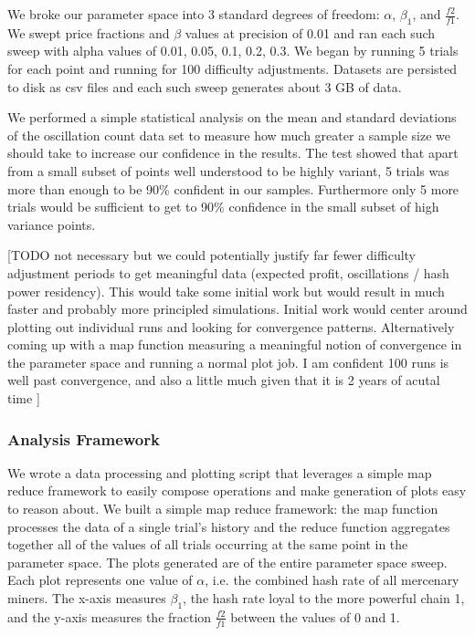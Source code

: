 \documentclass[10pt, preprint]{aastex}
\begin{document}
We broke our parameter space into 3 standard degrees of freedom: $\alpha$, $\beta_1$, and $\frac{f2}{f1}$.  We swept price fractions and $\beta$ values at precision of 0.01 and ran each such sweep with alpha values of 0.01, 0.05, 0.1, 0.2, 0.3.  We began by running 5 trials for each point and running for 100 difficulty adjustments.  Datasets are persisted to disk as csv files and each such sweep generates about 3 GB of data.

 We performed a simple statistical analysis on the mean and standard deviations of the oscillation count data set to measure how much greater a sample size we should take to increase our confidence in the results.  The test showed that apart from a small subset of points well understood to be highly variant, 5 trials was more than enough to be 90\% confident in our samples.  Furthermore only 5 more trials would be sufficient to get to 90\% confidence in the small subset of high variance points.

[TODO not necessary but we could potentially justify far fewer difficulty adjustment periods to get meaningful data (expected profit, oscillations / hash power residency).  This would take some initial work but would result in much faster and probably more principled simulations.  Initial work would center around plotting out individual runs and looking for convergence patterns.  Alternatively coming up with a map function measuring a meaningful notion of convergence in the parameter space and running a normal plot job.  I am confident 100 runs is well past convergence, and also a little much given that it is 2 years of acutal time ]

\subsubsection{Analysis Framework}
We wrote a data processing and plotting script that leverages a simple map reduce framework to easily compose operations and make generation of plots easy to reason about.  We built a simple map reduce framework: the map function processes the data of a single trial's history and the reduce function aggregates together all of the values of all trials occurring at the same point in the parameter space.  The plots generated are of the entire parameter space sweep.  Each plot represents one value of $\alpha$, i.e. the combined hash rate of all mercenary miners.  The x-axis measures $\beta_1$, the hash rate loyal to the more powerful chain 1, and the y-axis measures the fraction $\frac{f2}{f1}$ between the values of 0 and 1.
\end{document}
